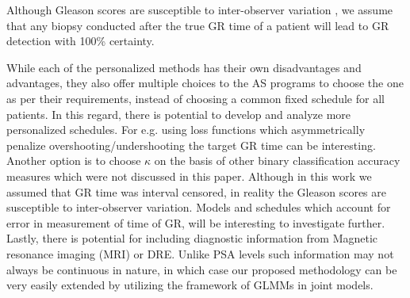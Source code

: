 Although Gleason scores are susceptible to inter-observer variation \citep{Gleason_interobs_var}, we assume that any biopsy conducted after the true GR time of a patient will lead to GR detection with 100\% certainty.

While each of the personalized methods has their own disadvantages and advantages, they also offer multiple choices to the AS programs to choose the one as per their requirements, instead of choosing a common fixed schedule for all patients. In this regard, there is potential to develop and analyze more personalized schedules. For e.g. using loss functions which asymmetrically penalize overshooting/undershooting the target GR time can be interesting. Another option is to choose $\kappa$ on the basis of other binary classification accuracy measures which were not discussed in this paper. Although in this work we assumed that GR time was interval censored, in reality the Gleason scores are susceptible to inter-observer variation. Models and schedules which account for error in measurement of time of GR, will be interesting to investigate further. Lastly, there is potential for including diagnostic information from Magnetic resonance imaging (MRI) or DRE. Unlike PSA levels such information may not always be continuous in nature, in which case our proposed methodology can be very easily extended by utilizing the framework of GLMMs in joint models.
